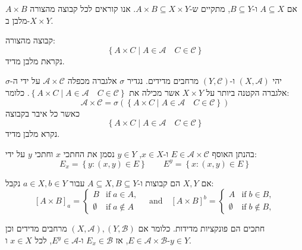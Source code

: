 \documentclass{tstextbook}
\begin{document}
\begin{definition}[מלבן]
אם \(A \subseteq X\) ו-\(B \subseteq Y\), מתקיים ש-\(A \times B \subseteq X \times Y\). אנו קוראים לכל קבוצה מהצורה \(A \times B\) מלבן ב-\(X \times Y\).

\end{definition}
\begin{definition}
קבוצה מהצורה:
$$\left\{  A\times C\mid A \in \mathcal{A} \quad C \in \mathcal{C}   \right\}$$
נקראת מלבן מדיד.

\end{definition}
\begin{definition}
יהי \((X, \mathcal{A})\) ו-\((Y, \mathcal{C})\) מרחבים מדידים. נגדיר \(\sigma\) אלגברה מכפלה \(\mathcal{A}\times \mathcal{ C}\) על ידי ה-\(\sigma\) אלגברה הקטנה ביותר על \(X\times Y\) אשר מכילה את \(\left\{  A\times C\mid A \in \mathcal{A} \quad C \in \mathcal{C}   \right\}\). כלומר:
$$\mathcal{A} \times \mathcal{C} =\sigma(\left\{  A\times C\mid A \in \mathcal{A} \quad C \in \mathcal{C}   \right\})$$
כאשר כל איבר בקבוצה 
$$\left\{  A\times C\mid A \in \mathcal{A} \quad C \in \mathcal{C}   \right\}$$
נקרא מלבן מדיד.

\end{definition}
\begin{definition}[חתך]
בהנתן האוסף \(E \in \mathcal{A}\times \mathcal{ C}\) ו-\(x \in X\), \(y \in Y\) נסמן את החתכי \(x\) וחתכי \(y\) על ידי:
$$E_{x}=\left\{ y:(x,y)\in E \right\}\qquad E^{y}=\left\{ x:(x,y)\in E \right\}$$

\end{definition}
\begin{example}
אם \(X,Y\) הם קבוצות ו-\(A\subseteq X, B\subseteq Y\) עבור \(a \in X, b \in Y\) נקבל:
$$[A\times B]_{a}=\begin{cases}B&{\mathrm{if}\;a\in A,}\\ {\emptyset}&{\mathrm{if}\;a\not\in A}\end{cases}\quad{\mathrm{and}}\quad[A\times B]^{b}=\begin{cases}A&{\mathrm{if}\;b\in B,}\\ {\emptyset}&{\mathrm{if}\;b\not\in B,}\end{cases}$$

\end{example}
\begin{proposition}
חתכים הם פונקציות מדידות. כלומר אם \(\left( X,\mathcal{A} \right),\left( Y,\mathcal{B} \right)\) מרחבים מדידים וכן \(E \in \mathcal{A} \times \mathcal{B}\), אז \(E_x \in \mathcal{B}\) ו-\(E^y \in \mathcal{A}\), לכל \(x \in X\) ו-\(y \in Y\).

\end{proposition}
\end{document}
